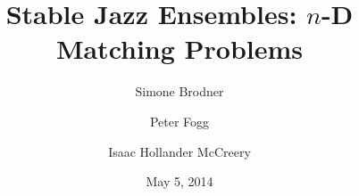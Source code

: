 
\title[$n$-D Stable Matching]{Stable Jazz Ensembles: $n$-D Matching Problems}
\author[Brodner, Fogg, McCreery]{Simone Brodner \and Peter Fogg \and Isaac Hollander McCreery}
\date{May 5, 2014}

\usepackage[parfill]{parskip} %
\usepackage{amsmath,amssymb,amsthm} %
\usepackage{paralist}
\usepackage{algorithm}
\usepackage[noend]{algorithmic}
\usepackage{moreenum}
\usepackage{graphicx}
\usepackage{ulem}

\AtBeginSection[]
{
	\begin{frame}
		\tableofcontents[currentsection]
	\end{frame}
}



%

%

\newcommand{\upth}{^{\text{th}}}
\newcommand{\eval}{\Big|}
\newcommand{\NP}{NP}
